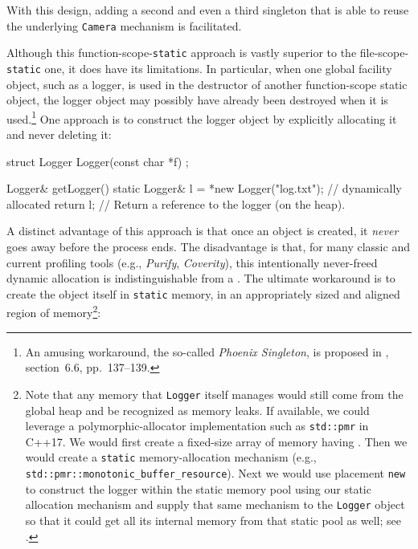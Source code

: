 \noindent With this design, adding a second and even a third singleton that is
able to reuse the underlying \lstinline!Camera! mechanism is facilitated.

Although this function-scope-\lstinline!static! approach is vastly superior
to the file-scope-\lstinline!static! one, it does have its limitations. In
particular, when one global facility object, such as a logger, is used
in the destructor of another function-scope static object, the logger
object may possibly have already been destroyed when it is
used.\footnote{An amusing workaround, the so-called \emph{Phoenix
Singleton}, is proposed in \cite{alexandrescu01}, section~6.6, pp.~137--139.} One approach is to construct the logger object by
explicitly allocating it and never deleting it:

\begin{emcppshiddenlisting}[emcppsbatch={e12,e13,e16,e17}]
struct Logger {
  Logger(const char *f) {}
};
\end{emcppshiddenlisting}
\begin{emcppslisting}[emcppsbatch=e12]
Logger& getLogger()
{
    static Logger& l = *new Logger("log.txt");  // dynamically allocated
    return l;  // Return a reference to the logger (on the heap).
}
\end{emcppslisting}

\noindent A distinct advantage of this approach is that once an object is created, it
\emph{never} goes away before the process ends. The disadvantage is
that, for many classic and current profiling tools (e.g., \emph{Purify},
\emph{Coverity}), this intentionally never-freed dynamic allocation is
indistinguishable from a . The ultimate workaround
is to create the object itself in \lstinline!static! memory, in an
appropriately sized and aligned region of memory{\cprotect\footnote{Note
that any memory that \lstinline!Logger! itself manages would still come
from the global heap and be recognized as memory leaks. If available,
we could leverage a polymorphic-allocator implementation such as
\lstinline!std::pmr! in C++17. We would first create a fixed-size array
of memory having . Then we would
create a \lstinline!static! memory-allocation mechanism (e.g.,
\lstinline!std::pmr::monotonic_buffer_resource!). Next we would use
placement \lstinline!new! to construct the logger within the static
memory pool using our static allocation mechanism and supply that same
mechanism to the \lstinline!Logger! object so that it could get all its
  internal memory from that static pool as well; see \cite{lakos22}.}}:

